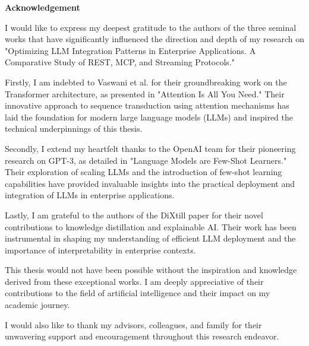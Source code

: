 \vspace*{4cm}
\begin{center}
    {\Large \bf Acknowledgement}
\end{center} \vskip 0.5cm \vskip 0.5cm

I would like to express my deepest gratitude to the authors of the three seminal works that have significantly influenced the direction and depth of my research on "Optimizing LLM Integration Patterns in Enterprise Applications. A Comparative Study of REST, MCP, and Streaming Protocols."

Firstly, I am indebted to Vaswani et al. for their groundbreaking work on the Transformer architecture, as presented in "Attention Is All You Need." Their innovative approach to sequence transduction using attention mechanisms has laid the foundation for modern large language models (LLMs) and inspired the technical underpinnings of this thesis.

Secondly, I extend my heartfelt thanks to the OpenAI team for their pioneering research on GPT-3, as detailed in "Language Models are Few-Shot Learners." Their exploration of scaling LLMs and the introduction of few-shot learning capabilities have provided invaluable insights into the practical deployment and integration of LLMs in enterprise applications.

Lastly, I am grateful to the authors of the DiXtill paper for their novel contributions to knowledge distillation and explainable AI. Their work has been instrumental in shaping my understanding of efficient LLM deployment and the importance of interpretability in enterprise contexts.

This thesis would not have been possible without the inspiration and knowledge derived from these exceptional works. I am deeply appreciative of their contributions to the field of artificial intelligence and their impact on my academic journey.

\bigskip

I would also like to thank my advisors, colleagues, and family for their unwavering support and encouragement throughout this research endeavor.
